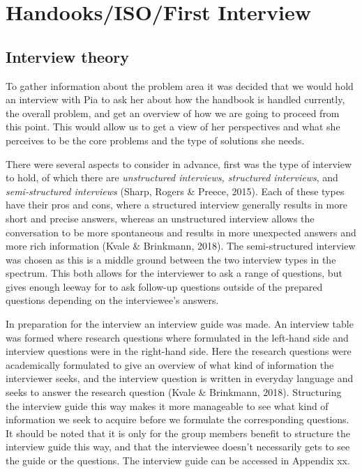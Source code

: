 \section{Handooks/ISO/First Interview}

\subsection{Interview theory}

To gather information about the problem area it was decided that we would hold an interview with Pia to ask her about how the handbook is handled currently, the overall problem, and get an overview of how we are going to proceed from this point. This would allow us to get a view of her perspectives and what she perceives to be the core problems and the type of solutions she needs.

There were several aspects to consider in advance, first was the type of interview to hold, of which there are \textit{unstructured interviews, structured interviews}, and \textit{semi-structured interviews} (Sharp, Rogers \& Preece, 2015). Each of these types have their pros and cons, where a structured interview generally results in more short and precise answers, whereas an unstructured interview allows the conversation to be more spontaneous and results in more unexpected answers and more rich information (Kvale \& Brinkmann, 2018). The semi-structured interview was chosen as this is a middle ground between the two interview types in the spectrum. This both allows for the interviewer to ask a range of questions, but gives enough leeway for to ask follow-up questions outside of the prepared questions depending on the interviewee’s answers.

In preparation for the interview an interview guide was made. An interview table was formed where research questions where formulated in the left-hand side and interview questions were in the right-hand side. Here the research questions were academically formulated to give an overview of what kind of information the interviewer seeks, and the interview question is written in everyday language and seeks to answer the research question (Kvale \& Brinkmann, 2018). Structuring the interview guide this way makes it more manageable to see what kind of information we seek to acquire before we formulate the corresponding questions. It should be noted that it is only for the group members benefit to structure the interview guide this way, and that the interviewee doesn’t necessarily gets to see the guide or the questions. The interview guide can be accessed in Appendix xx.

